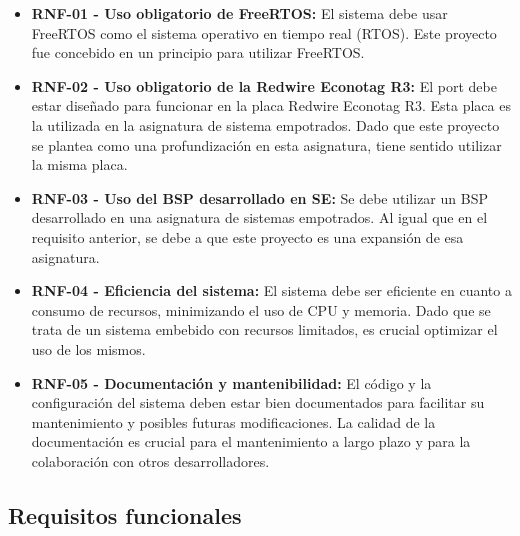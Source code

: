 \begin{itemize}
    \item \textbf{RNF-01 - Uso obligatorio de FreeRTOS:} El sistema debe usar FreeRTOS como el sistema operativo en tiempo real (RTOS). Este proyecto fue concebido en un principio para utilizar FreeRTOS.
    \item \textbf{RNF-02 - Uso obligatorio de la Redwire Econotag R3:} El port debe estar diseñado para funcionar en la placa Redwire Econotag R3. Esta placa es la utilizada en la asignatura de sistema empotrados. Dado que este proyecto se plantea como una profundización en esta asignatura, tiene sentido utilizar la misma placa.
    \item \textbf{RNF-03 - Uso del BSP desarrollado en SE:} Se debe utilizar un BSP desarrollado en una asignatura de sistemas empotrados. Al igual que en el requisito anterior, se debe a que este proyecto es una expansión de esa asignatura.
    \item \textbf{RNF-04 - Eficiencia del sistema:} El sistema debe ser eficiente en cuanto a consumo de recursos, minimizando el uso de CPU y memoria. Dado que se trata de un sistema embebido con recursos limitados, es crucial optimizar el uso de los mismos.
    \item \textbf{RNF-05 - Documentación y mantenibilidad:} El código y la configuración del sistema deben estar bien documentados para facilitar su mantenimiento y posibles futuras modificaciones. La calidad de la documentación es crucial para el mantenimiento a largo plazo y para la colaboración con otros desarrolladores.
\end{itemize}

\subsection{Requisitos funcionales}

